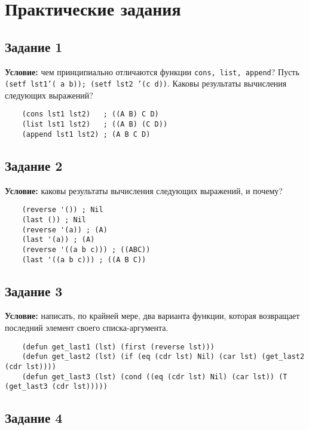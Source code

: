 \chapter{Практические задания}

\section{Задание 1}

\textbf{Условие:} чем принципиально отличаются функции \texttt{cons, list, append}?
Пусть \texttt{(setf lst1'( a b)); (setf lst2 '(c d))}. Каковы результаты вычисления следующих выражений?

\begin{lstlisting}
    (cons lst1 lst2)   ; ((A B) C D)
    (list lst1 lst2)   ; ((A B) (C D))
    (append lst1 lst2) ; (A B C D)
\end{lstlisting}


\section{Задание 2}

\textbf{Условие:} каковы результаты вычисления следующих выражений, и почему?

\begin{lstlisting}
    (reverse '()) ; Nil
    (last ()) ; Nil
    (reverse '(a)) ; (A)
    (last '(a)) ; (A)
    (reverse '((a b c))) ; ((ABC))
    (last '((a b c))) ; ((A B C))
\end{lstlisting}


\section{Задание 3}

\textbf{Условие:} написать, по крайней мере, два варианта функции, которая возвращает последний элемент своего списка-аргумента.


\begin{lstlisting}
    (defun get_last1 (lst) (first (reverse lst)))
    (defun get_last2 (lst) (if (eq (cdr lst) Nil) (car lst) (get_last2 (cdr lst))))
    (defun get_last3 (lst) (cond ((eq (cdr lst) Nil) (car lst)) (T (get_last3 (cdr lst)))))
\end{lstlisting}


\section{Задание 4}

